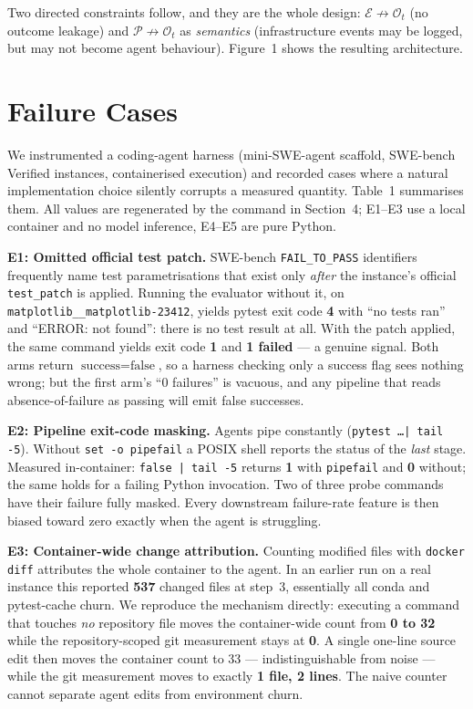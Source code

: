 \documentclass[letterpaper]{article}
\begin{document}
Two directed constraints follow, and they are the whole design:
$\mathcal{E} \not\rightarrow \mathcal{O}_t$ (no outcome leakage) and
$\mathcal{P} \not\rightarrow \mathcal{O}_t$ as \emph{semantics} (infrastructure
events may be logged, but may not become agent behaviour). Figure~1 shows the
resulting architecture.

\section{Failure Cases}

We instrumented a coding-agent harness (mini-SWE-agent scaffold, SWE-bench
Verified instances, containerised execution) and recorded cases where a natural
implementation choice silently corrupts a measured quantity. Table~1 summarises
them. All values are regenerated by the command in Section~4; E1--E3 use a local
container and no model inference, E4--E5 are pure Python.

\textbf{E1: Omitted official test patch.} SWE-bench \texttt{FAIL\_TO\_PASS}
identifiers frequently name test parametrisations that exist only \emph{after}
the instance's official \texttt{test\_patch} is applied. Running the evaluator
without it, on \texttt{matplotlib\_\_matplotlib-23412}, yields pytest exit code
\textbf{4} with ``no tests ran'' and ``ERROR: not found'': there is no test
result at all. With the patch applied, the same command yields exit code
\textbf{1} and \textbf{1 failed} --- a genuine signal. Both arms return
$\text{success}=\text{false}$, so a harness checking only a success flag sees
nothing wrong; but the first arm's ``0 failures'' is vacuous, and any pipeline
that reads absence-of-failure as passing will emit false successes.

\textbf{E2: Pipeline exit-code masking.} Agents pipe constantly
(\texttt{pytest \ldots | tail -5}). Without \texttt{set -o pipefail} a POSIX
shell reports the status of the \emph{last} stage. Measured in-container:
\texttt{false | tail -5} returns \textbf{1} with \texttt{pipefail} and
\textbf{0} without; the same holds for a failing Python invocation. Two of three
probe commands have their failure fully masked. Every downstream failure-rate
feature is then biased toward zero exactly when the agent is struggling.

\textbf{E3: Container-wide change attribution.} Counting modified files with
\texttt{docker diff} attributes the whole container to the agent. In an earlier
run on a real instance this reported \textbf{537} changed files at step~3,
essentially all conda and pytest-cache churn. We reproduce the mechanism
directly: executing a command that touches \emph{no} repository file moves the
container-wide count from \textbf{0 to 32} while the repository-scoped git
measurement stays at \textbf{0}. A single one-line source edit then moves the
container count to 33 --- indistinguishable from noise --- while the git
measurement moves to exactly \textbf{1 file, 2 lines}. The naive counter cannot
separate agent edits from environment churn.
\end{document}
